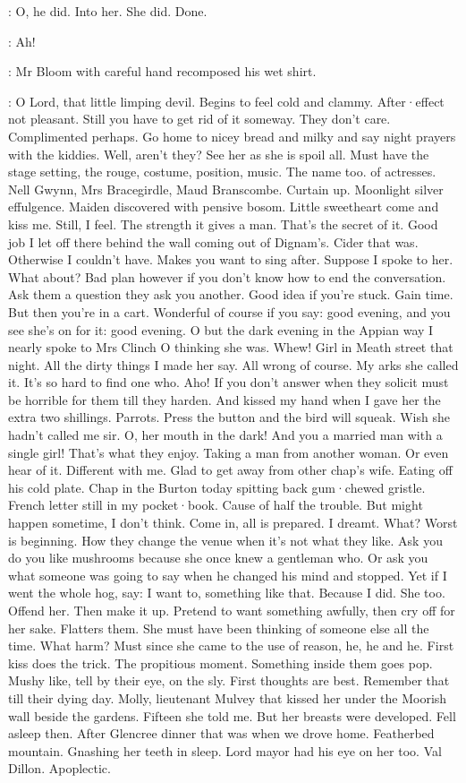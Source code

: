 :
O,
he did.
Into her.
She did.
Done.

\Bloom:
Ah!

:
Mr Bloom with careful hand
recomposed his wet shirt.

\Bloom:
O Lord,
that little limping devil.
Begins to feel cold and clammy.
After·effect not pleasant.
Still you have to get rid of it someway.
They don't care.
Complimented
perhaps.
Go home to nicey bread and milky
and say night prayers with the kiddies.
Well,
aren't they?
See her as she is
spoil all.
Must have the stage setting,
the rouge,
costume,
position,
music.
The name too.
 of actresses.
Nell Gwynn,
Mrs Bracegirdle,
Maud Branscombe.
Curtain up.
Moonlight silver effulgence.
Maiden discovered with pensive bosom.
Little sweetheart
come and kiss me.
Still,
I feel.
The strength
it gives a man.
That's the secret of it.
Good job
I let off there behind the wall
coming out of Dignam's.
Cider that was.
Otherwise I couldn't have.
Makes you want to sing
after.
Suppose I spoke to her.
What about?
Bad plan however
if you don't know
how to end the conversation.
Ask them a question
they ask you another.
Good idea if you're stuck.
Gain time.
But then you're in a cart.
Wonderful of course
if you say:
good evening,
and you see
she's on for it:
good evening.
O
but the dark evening in the Appian way
I nearly spoke to Mrs Clinch
O thinking she was.
Whew!
Girl in Meath street that night.
All the dirty things
I made her say.
All wrong
of course.
My arks
she called it.
It's so hard to find one who.
Aho!
If you don't answer
when they solicit
must be horrible for them
till they harden.
And kissed my hand
when I gave her
the extra two shillings.
Parrots.
Press the button
and the bird will squeak.
Wish she hadn't called me sir.
O,
her mouth in the dark!
And you a married man
with a single girl!
That's what they enjoy.
Taking a man from another woman.
Or even hear of it.
Different with me.
Glad to get away from other chap's wife.
Eating off his cold plate.
Chap in the Burton today
spitting back gum·chewed gristle.
French letter still in my pocket·book.
Cause of half the trouble.
But might happen sometime,
I don't think.
Come in,
all is prepared.
I dreamt.
What?
Worst is beginning.
How they change the venue
when it's not what they like.
Ask you
do you like mushrooms
because she once
knew a gentleman who.
Or ask you
what someone was going to say
when he changed his mind
and stopped.
Yet if I went the whole hog,
say:
I want to,
something
like that.
Because I did.
She too.
Offend her.
Then make it up.
Pretend to want something awfully,
then cry off
for her sake.
Flatters them.
She must have been thinking of someone else
all the time.
What harm?
Must
since she came to the use of reason,
he,
he and he.
First kiss does the trick.
The propitious moment.
Something inside them goes pop.
Mushy like,
tell by their eye,
on the sly.
First thoughts are best.
Remember that
till their dying day.
Molly,
lieutenant Mulvey that kissed her
under the Moorish wall
beside the gardens.
Fifteen
she told me.
But her breasts were developed.
Fell asleep then.
After Glencree dinner that was
when we drove home.
Featherbed mountain.
Gnashing her teeth in sleep.
Lord mayor had his eye on her too.
Val Dillon.
Apoplectic.

